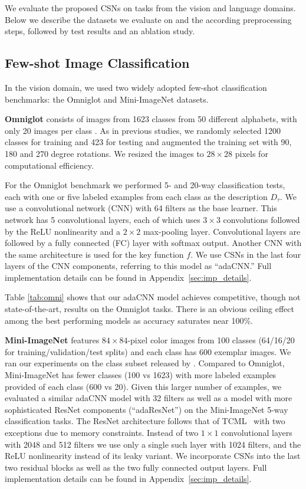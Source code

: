 \documentclass{article}
\begin{document}
We evaluate the proposed CSNs on tasks from the vision and language domains. Below we describe the datasets we evaluate on and the according preprocessing steps, followed by test results and an ablation study.

\subsection{Few-shot Image Classification}
In the vision domain, we used two widely adopted few-shot classification benchmarks: the Omniglot and Mini-ImageNet datasets.

{\bf Omniglot} consists of images from 1623 classes from 50 different alphabets, with only 20 images per class \cite{lake2015human}. As in previous studies, we randomly selected 1200 classes for training and 423 for testing and augmented the training set with 90, 180 and 270 degree rotations. We resized the images to $28 \times 28$ pixels for computational efficiency.

For the Omniglot benchmark we performed 5- and 20-way classification tests, each with one or five labeled examples from each class as the description $D_\tau$. We use a convolutional network (CNN) with 64 filters as the base learner. This network has 5 convolutional layers, each of which uses $3 \times 3$ convolutions followed by the ReLU nonlinearity and a $2 \times 2$ max-pooling layer. Convolutional layers are followed by a fully connected (FC) layer with softmax output. Another CNN with the same architecture is used for the key function $f$. We use CSNs in the last four layers of the CNN components, referring to this model as ``adaCNN.'' Full implementation details can be found in Appendix~\ref{sec:imp_details}.

Table \ref{tab:omni} shows that our adaCNN model achieves competitive, though not state-of-the-art, results on the Omniglot tasks. There is an obvious ceiling effect among the best performing models as accuracy saturates near 100\%.

{\bf Mini-ImageNet} features $84 \times 84$-pixel color images from 100 classes (64/16/20 for training/validation/test splits) and each class has 600 exemplar images. We ran our experiments on the class subset released by \citet{Sachin2017}.
Compared to Omniglot, Mini-ImageNet has fewer classes (100 vs 1623) with more labeled examples provided of each class (600 vs 20). Given this larger number of examples,  we evaluated a similar adaCNN model with 32 filters as well as a model with more sophisticated ResNet components (``adaResNet'') on the Mini-ImageNet 5-way classification tasks. The ResNet architecture follows that of TCML~\citep{mishra2017meta} with two exceptions due to memory constraints. Instead of two $1 \times 1$ convolutional layers with 2048 and 512 filters we use only a single such layer with 1024 filters, and the ReLU nonlinearity instead of its leaky variant. We incorporate CSNs into the last two residual blocks as well as the two fully connected output layers. Full implementation details can be found in Appendix~\ref{sec:imp_details}.
\end{document}

